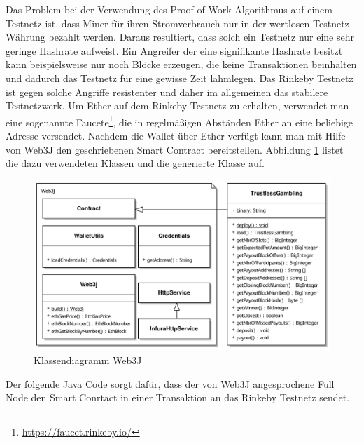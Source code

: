 Das Problem bei der Verwendung des Proof-of-Work Algorithmus auf einem Testnetz ist, dass Miner für ihren Stromverbrauch nur in der wertlosen Testnetz-Währung bezahlt werden. Daraus resultiert, dass solch ein Testnetz nur eine sehr geringe Hashrate aufweist. Ein Angreifer der eine signifikante Hashrate besitzt kann beispielsweise nur noch Blöcke erzeugen, die keine Transaktionen beinhalten und dadurch das Testnetz für eine gewisse Zeit lahmlegen. Das Rinkeby Testnetz ist gegen solche Angriffe resistenter und daher im allgemeinen das stabilere Testnetzwerk. Um Ether auf dem Rinkeby Testnetz zu erhalten, verwendet man eine sogenannte Faucete\footnote{\url{https://faucet.rinkeby.io/}}, die in regelmäßigen Abständen Ether an eine beliebige Adresse versendet. Nachdem die Wallet über Ether verfügt kann man mit Hilfe von Web3J den geschriebenen Smart Contract bereitstellen. Abbildung \ref{fig:eth_web3j} listet die dazu verwendeten Klassen und die generierte  Klasse auf.

\begin{figure}[H]
\centering
\includegraphics[width=1\linewidth]{Figures/umsetzung_eth/eth_web3j}
\decoRule
\caption{Klassendiagramm Web3J}
\label{fig:eth_web3j}
\end{figure}

Der folgende Java Code sorgt dafür, dass der von Web3J angesprochene Full Node den Smart Conrtact in einer Transaktion an das Rinkeby Testnetz sendet.



